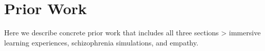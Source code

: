 \chapter{Prior Work}
\label{ch:priorwork}

Here we describe concrete prior work that includes all three sections > immersive learning experiences, schizophrenia simulations, and empathy.

